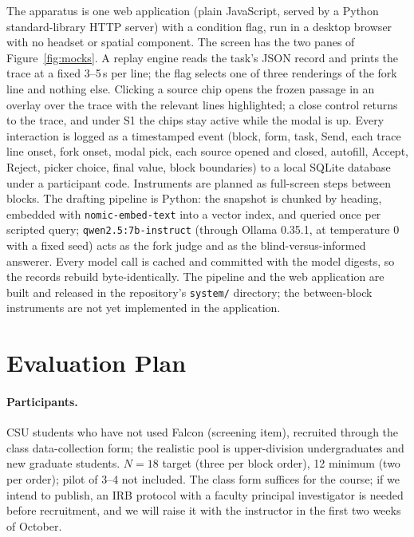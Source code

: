 \documentclass[sigconf,nonacm]{acmart}
\begin{document}
The apparatus is one web application (plain JavaScript, served by a Python
standard-library HTTP server) with a condition flag, run in a desktop browser with no headset or spatial
component. The screen has the two panes of Figure~\ref{fig:mocks}. A
replay engine reads the task's JSON record and prints the trace at a fixed
3--5\,s per line; the flag selects one of three renderings of the fork
line and nothing else. Clicking a source chip opens the frozen passage in
an overlay over the trace with the relevant lines highlighted; a close
control returns to the trace, and under S1 the chips stay active while
the modal is up. Every interaction is logged as a timestamped event
(block, form, task, Send, each trace line onset, fork onset, modal pick,
each source opened and closed, autofill, Accept, Reject, picker choice,
final value, block boundaries) to a local SQLite database under a
participant code.
Instruments are planned as full-screen steps between blocks. The drafting
pipeline is Python: the snapshot is chunked by heading, embedded with
\texttt{nomic-embed-text} into a vector index, and queried once per
scripted query; \texttt{qwen2.5:7b-instruct} (through Ollama 0.35.1, at
temperature 0 with a fixed seed) acts as the fork judge and as the
blind-versus-informed answerer. Every model call is cached and committed
with the model digests, so the records rebuild byte-identically. The
pipeline and the web application are built and released in the
repository's \texttt{system/} directory; the between-block instruments
are not yet implemented in the application.

\section{Evaluation Plan}
\label{sec:eval}

\paragraph{Participants.}
CSU students who have not used Falcon (screening item), recruited through
the class data-collection form; the realistic pool is upper-division
undergraduates and new graduate students. $N{=}18$ target (three per block
order), 12 minimum (two per order); pilot of 3--4 not included. The class
form suffices for the course; if we intend to publish, an IRB protocol
with a faculty principal investigator is needed before recruitment, and we
will raise it with the instructor in the first two weeks of October.
\end{document}
